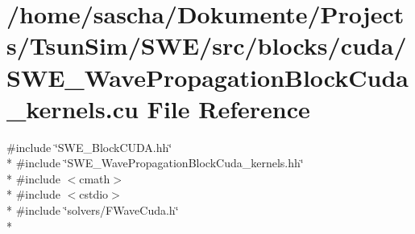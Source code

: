 \hypertarget{SWE__WavePropagationBlockCuda__kernels_8cu}{\section{/home/sascha/\-Dokumente/\-Projects/\-Tsun\-Sim/\-S\-W\-E/src/blocks/cuda/\-S\-W\-E\-\_\-\-Wave\-Propagation\-Block\-Cuda\-\_\-kernels.cu File Reference}
\label{SWE__WavePropagationBlockCuda__kernels_8cu}
}
{\ttfamily \#include \char`\"{}S\-W\-E\-\_\-\-Block\-C\-U\-D\-A.\-hh\char`\"{}}\\*
{\ttfamily \#include \char`\"{}S\-W\-E\-\_\-\-Wave\-Propagation\-Block\-Cuda\-\_\-kernels.\-hh\char`\"{}}\\*
{\ttfamily \#include $<$cmath$>$}\\*
{\ttfamily \#include $<$cstdio$>$}\\*
{\ttfamily \#include \char`\"{}solvers/\-F\-Wave\-Cuda.\-h\char`\"{}}\\*
